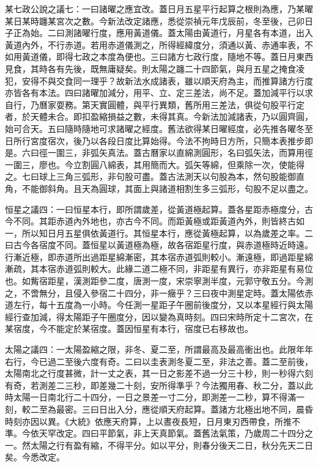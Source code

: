 某七政公說之議七：一曰諸曜之應宜改。蓋日月五星平行起算之根則為應，乃某曜某日某時躔某宮次之數。今新法改定諸應，悉從崇禎元年戊辰前，冬至後，己卯日子正為始。二曰測諸曜行度，應用黃道儀。蓋太陽由黃道行，月星各有本道，出入黃道內外，不行赤道。若用赤道儀測之，所得經緯度分，須通以黃、赤通率表，不如用黃道儀，即得七政之本度為便也。三曰諸方七政行度，隨地不等。蓋日月東西見食，其時各有先後，既無庸疑矣。則太陽之躔二十四節氣，與月五星之掩食凌犯，安得不與交食同一理乎？故新法水成諸表，雖以順天府為主，而推算諸方行度亦皆各有本法。四曰諸曜加減分，用平、立、定三差法，尚不足。蓋加減平行以求自行，乃曆家耍務。第天實圓體，與平行異類，舊所用三差法，俱從句股平行定者，於天體未合。即扣盈縮損益之數，未得其真。今新法加減諸表，乃以圓齊圓，始可合天。五曰隨時隨地可求諸曜之經度。舊法欲得某日曜經度，必先推各曜冬至日所行宮度宿次，後乃以各段日度比算始得。今法不拘時日方所，只簡本表推步即是。六曰徑一圍三，非弧矢真法。蓋古曆家以直綿測圓形，名曰弧矢法，而算用徑一圍三，廖也。今立割圓八綿表，其用簡而大。弧矢等綿，但乘除一次，使能得之。七曰球上三角三弧形，非句股可盡。蓋古法測天以句股為本，然句股能御直角，不能御斜角。且天為圓球，其面上與諸道相割生多三弧形，句股不足以盡之。

恒星之議四：一曰恒星本行，即所謂歲差，從黃道極起算。蓋各星距赤極度分，古今不同。其距赤道內外地也，亦古今不同。而距黃極或距黃道內外，則皆終古如一，所以知日月五星俱依黃道行。其恒星本行，應從黃極起算，以為歲差之率。二曰古今各宿度不同。蓋恒星以黃道極為極，故各宿距星行度，與赤道極時近時遠。行漸近極，即赤道所出過距星綿漸密，其本宿赤道弧則較小。漸遠極，即過距星綿漸疏，其本宿赤道弧則較大。此緣二道二極不同，非距星有異行，亦非距星有易位也。如觜宿距星，漢測距參二度，唐測一度，宋崇寧測半度，元郭守敬五分。今測之，不啻無分，且侵入參宿二十四分，非一癥乎？三曰夜中測星定時。蓋太陽依赤道左行，每十五度為一小時。今任測一星距子午圈前後度分，又以本星經行與太陽經行查加減，得太陽距子午圈度分，因以變為真時刻。四曰宋時所定十二宮次，在某宿度，今不能定於某宿度。蓋因恒星有本行，宿度已右移故也。

太陽之議四：一太陽盈縮之限，非冬、夏二至，所謂最高及最高衝出也。此限年年右行，今已過二至後六度有奇。二曰以圭表測冬夏二至，非法之善。蓋二至前後，太陽南北之行度甚微，計一丈之表，其一日之影差不過一分三十秒，則一秒得六刻有奇，若測差二三秒，即差幾二十刻，安所得準乎？今法獨用春、秋二分，蓋以此時太陽一日南北行二十四分，一日之景差一寸二分，即測差一二秒，算不得滿一刻，較二至為最密。三曰日出入分，應從順天府起算。蓋諸方北極出地不同，晨昏時刻亦因以異。《大統》依應天府算，上以晝夜長短，日月東刃西帶食，所推不準。今依天罕改定。四曰平節氣，非上天真節氣。蓋舊法氣策，乃歲周二十四分之一。然太陽之行有盈有縮，不得平分。如以平分，則春分後天二日，秋分先天二日矣。今悉改定。

